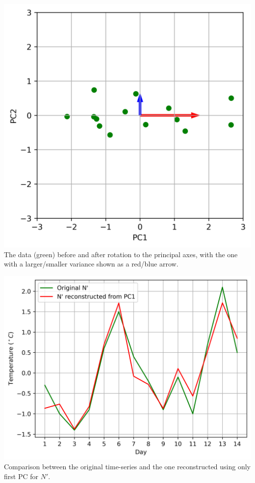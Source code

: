 \begin{solution}
\begin{center}
\includegraphics[scale = 0.75]{graphics/PCA_exmp_2.png}\\
The data (green) before and after rotation to the principal axes, with the one with a larger/smaller variance shown as a red/blue arrow.
\end{center}
\begin{center}
\includegraphics[scale = 0.8]{graphics/PCA_exmp_3.png}\\
Comparison between the original time-series and the one reconstructed using only first PC for $N'$.
\end{center}
\end{solution}

